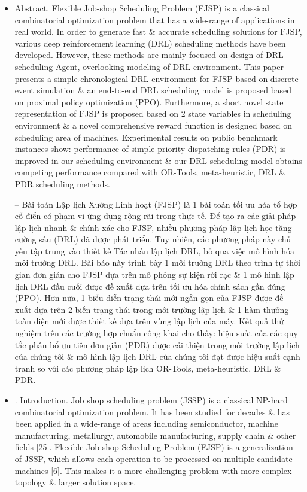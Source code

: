 \documentclass{article}
\begin{document}
\begin{itemize}
    \item {\sf Abstract.} Flexible Job-shop Scheduling Problem (FJSP) is a classical combinatorial optimization problem that has a wide-range of applications in real world. In order to generate fast \& accurate scheduling solutions for FJSP, various deep reinforcement learning (DRL) scheduling methods have been developed. However, these methods are mainly focused on design of DRL scheduling Agent, overlooking modeling of DRL environment. This paper presents a simple chronological DRL environment for FJSP based on discrete event simulation \& an end-to-end DRL scheduling model is proposed based on proximal policy optimization (PPO). Furthermore, a short novel state representation of FJSP is proposed based on 2 state variables in scheduling environment \& a novel comprehensive reward function is designed based on scheduling area of machines. Experimental results on public benchmark instances show: performance of simple priority dispatching rules (PDR) is improved in our scheduling environment \& our DRL scheduling model obtains competing performance compared with OR-Tools, meta-heuristic, DRL \& PDR scheduling methods.

    -- Bài toán Lập lịch Xưởng Linh hoạt (FJSP) là 1 bài toán tối ưu hóa tổ hợp cổ điển có phạm vi ứng dụng rộng rãi trong thực tế. Để tạo ra các giải pháp lập lịch nhanh \& chính xác cho FJSP, nhiều phương pháp lập lịch học tăng cường sâu (DRL) đã được phát triển. Tuy nhiên, các phương pháp này chủ yếu tập trung vào thiết kế Tác nhân lập lịch DRL, bỏ qua việc mô hình hóa môi trường DRL. Bài báo này trình bày 1 môi trường DRL theo trình tự thời gian đơn giản cho FJSP dựa trên mô phỏng sự kiện rời rạc \& 1 mô hình lập lịch DRL đầu cuối được đề xuất dựa trên tối ưu hóa chính sách gần đúng (PPO). Hơn nữa, 1 biểu diễn trạng thái mới ngắn gọn của FJSP được đề xuất dựa trên 2 biến trạng thái trong môi trường lập lịch \& 1 hàm thưởng toàn diện mới được thiết kế dựa trên vùng lập lịch của máy. Kết quả thử nghiệm trên các trường hợp chuẩn công khai cho thấy: hiệu suất của các quy tắc phân bổ ưu tiên đơn giản (PDR) được cải thiện trong môi trường lập lịch của chúng tôi \& mô hình lập lịch DRL của chúng tôi đạt được hiệu suất cạnh tranh so với các phương pháp lập lịch OR-Tools, meta-heuristic, DRL \& PDR.
    \item {. Introduction.} Job shop scheduling problem (JSSP) is a classical NP-hard combinatorial optimization problem. It has been studied for decades \& has been applied in a wide-range of areas including semiconductor, machine manufacturing, metallurgy, automobile manufacturing, supply chain \& other fields [25]. Flexible Job-shop Scheduling Problem (FJSP) is a generalization of JSSP, which allows each operation to be processed on multiple candidate machines [6]. This makes it a more challenging problem with more complex topology \& larger solution space.


\end{itemize}
\end{document}
